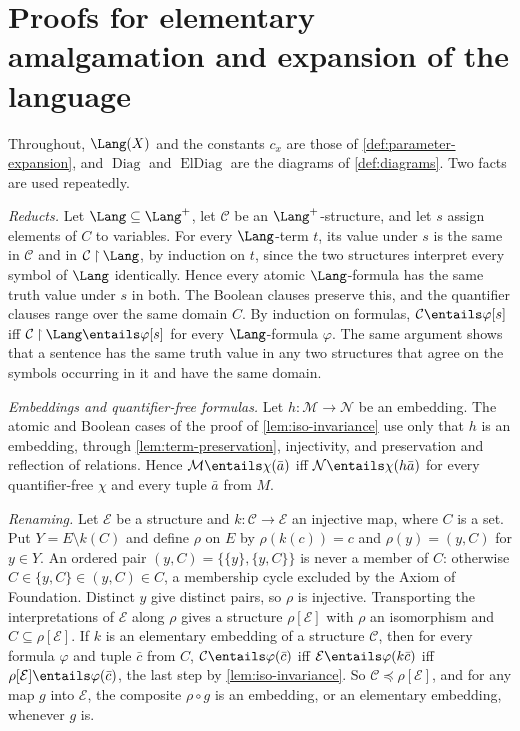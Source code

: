 \section{Proofs for elementary amalgamation and expansion of the language}
\label{sec:annex-p03-w03-p03-006-amalgamation}

Throughout, \(\Lang(X)\) and the constants \(c_x\) are those of
\cref{def:parameter-expansion}, and \(\operatorname{Diag}\) and
\(\operatorname{ElDiag}\) are the diagrams of \cref{def:diagrams}.
Two facts are used repeatedly.

\emph{Reducts.}  Let \(\Lang\subseteq\Lang^+\), let \(\mathcal C\) be an
\(\Lang^+\)-structure, and let \(s\) assign elements of \(C\) to variables.
For every \(\Lang\)-term \(t\), its value under \(s\) is the same in
\(\mathcal C\) and in \(\mathcal C\mathbin{\upharpoonright}\Lang\), by
induction on \(t\), since the two structures interpret every symbol of
\(\Lang\) identically.  Hence every atomic \(\Lang\)-formula has the same
truth value under \(s\) in both.  The Boolean clauses preserve this, and the
quantifier clauses range over the same domain \(C\).  By induction on
formulas, \(\mathcal C\entails\varphi[s]\) iff
\(\mathcal C\mathbin{\upharpoonright}\Lang\entails\varphi[s]\) for every
\(\Lang\)-formula \(\varphi\).  The same argument shows that a sentence
has the same truth value in any two structures that agree on the symbols
occurring in it and have the same domain.

\emph{Embeddings and quantifier-free formulas.}  Let
\(h:\mathcal M\to\mathcal N\) be an embedding.  The atomic and Boolean cases
of the proof of \cref{lem:iso-invariance} use only that \(h\) is an
embedding, through \cref{lem:term-preservation}, injectivity, and
preservation and reflection of relations.  Hence
\(\mathcal M\entails\chi(\bar a)\) iff \(\mathcal N\entails\chi(h\bar a)\)
for every quantifier-free \(\chi\) and every tuple \(\bar a\) from \(M\).

\emph{Renaming.}  Let \(\mathcal E\) be a structure and
\(k:\mathcal C\to\mathcal E\) an injective map, where \(C\) is a set.  Put
\(Y=E\setminus k(C)\) and define \(\rho\) on \(E\) by \(\rho(k(c))=c\) and
\(\rho(y)=(y,C)\) for \(y\in Y\).  An ordered pair
\((y,C)=\{\{y\},\{y,C\}\}\) is never a member of \(C\): otherwise
\(C\in\{y,C\}\in(y,C)\in C\), a membership cycle excluded by the Axiom of
Foundation.  Distinct \(y\) give distinct pairs, so \(\rho\) is injective.
Transporting the interpretations of \(\mathcal E\) along \(\rho\) gives a
structure \(\rho[\mathcal E]\) with \(\rho\) an isomorphism and
\(C\subseteq\rho[\mathcal E]\).  If \(k\) is an elementary embedding of a
structure \(\mathcal C\), then for every formula \(\varphi\) and tuple
\(\bar c\) from \(C\),
\(\mathcal C\entails\varphi(\bar c)\) iff
\(\mathcal E\entails\varphi(k\bar c)\) iff
\(\rho[\mathcal E]\entails\varphi(\bar c)\), the last step by
\cref{lem:iso-invariance}.  So \(\mathcal C\preccurlyeq\rho[\mathcal E]\),
and for any map \(g\) into \(\mathcal E\), the composite \(\rho\circ g\) is
an embedding, or an elementary embedding, whenever \(g\) is.

